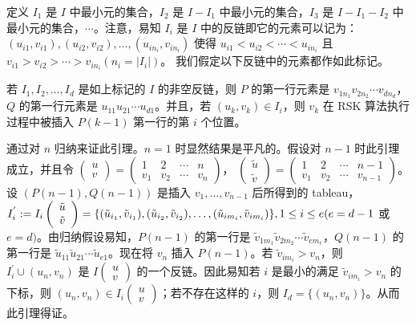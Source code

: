 定义 $I_1$ 是 $I$ 中最小元的集合，$I_2$ 是 $I-I_1$
中最小元的集合，$I_3$ 是 $I-I_1-I_2$
中最小元的集合，$\cdots$。注意，易知 $I_i$ 是 $I$
中的反链即它的元素可以记为：$(u_{i1}, v_{i1}), (u_{i2}, v_{i2}),
\ldots, (u_{in_i}, v_{in_i})$ 使得 $u_{i1}<u_{i2}<\cdots<u_{in_i}$
且
$v_{i1}>v_{i2}>\cdots>v_{in_i}(n_i=|I_i|)$。
我们假定以下反链中的元素都作如此标记。


\begin{lem}\label{ya}  若 $I_1, I_2, \ldots, I_d$ 是如上标记的 $I$ 的非空反链，则 $P$ 的第一行元素是 $v_{1n_1}v_{2n_2}\cdots
v_{dn_d}$，$Q$ 的第一行元素是 $u_{11}u_{21}\cdots u_{d1}$。并且，若
$(u_k, v_k)\in I_i$，则 $v_k$ 在 RSK 算法执行过程中被插入 $P(k-1)$
第一行的第 $i$ 个位置。
\end{lem}


 通过对 $n$ 归纳来证此引理。$n=1$
时显然结果是平凡的。假设对 $n-1$ 时此引理成立，并且令
$\left(\begin{array}{c}
u\\v\end{array}\right)=\left(\begin{array}{cccc}
1&2&\cdots&n\\v_1&v_2&\cdots&v_n\end{array}\right)$，
$\left(\begin{array}{c}
\tilde{u}\\\tilde{v}\end{array}\right)=\left(\begin{array}{cccc}
1&2&\cdots&n-1\\v_1&v_2&\cdots&v_{n-1}\end{array}\right)$。 设
$(P(n-1), Q(n-1))$ 是插入 $v_1, \ldots, v_{n-1}$ 后所得到的
tableau，$I_i^{'} :=I_i\left(\begin{array}{c}
\tilde{u}\\\tilde{v}\end{array}\right)=\{(\tilde{u}_{i_1},
\tilde{v}_{i_1}),  (\tilde{u}_{i_2}, \tilde{v}_{i_2}), \ldots,
(\tilde{u}_{im_i}, \tilde{v}_{im_i})\},\\ 1\leq i\leq e(e=d-1$ 或
$e=d)$。由归纳假设易知，$P(n-1)$ 的第一行是
$\tilde{v}_{1m_1}\tilde{v}_{2m_2}\cdots\tilde{v}_{em_e}$，$Q(n-1)$
的第一行是
$\tilde{u}_{11}\tilde{u}_{21}\cdots\tilde{u}_{e1}$。现在将 $v_n$
插入 $P(n-1)$。若 $\tilde{v}_{im_i}>v_n$，则 $I_i^{'}\cup (u_n,
v_n)$ 是 $I\left(\begin{array}{c} u\\v\end{array}\right)$
的一个反链。因此易知若 $i$ 是最小的满足 $\tilde{v}_{im_i}>v_n$
的下标，则 $(u_n, v_n)\in I_i\left(\begin{array}{c}
u\\v\end{array}\right)$；若不存在这样的 $i$，则 $I_d=\{(u_n,
v_n)\}$。从而此引理得证。

